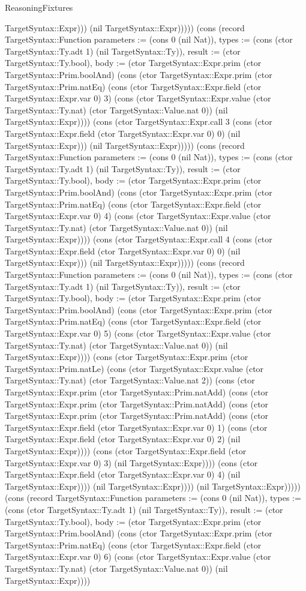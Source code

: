 \begin{lexlean}{ReasoningFixtures}
\begin{semanticmodule}
{TargetSyntax::Expr))) (nil TargetSyntax::Expr))))}) (cons (record TargetSyntax::Function {parameters := (cons 0 (nil Nat)), types := (cons (ctor TargetSyntax::Ty.adt 1) (nil TargetSyntax::Ty)), result := (ctor TargetSyntax::Ty.bool), body := (ctor TargetSyntax::Expr.prim (ctor TargetSyntax::Prim.boolAnd) (cons (ctor TargetSyntax::Expr.prim (ctor TargetSyntax::Prim.natEq) (cons (ctor TargetSyntax::Expr.field (ctor TargetSyntax::Expr.var 0) 3) (cons (ctor TargetSyntax::Expr.value (ctor TargetSyntax::Ty.nat) (ctor TargetSyntax::Value.nat 0)) (nil TargetSyntax::Expr)))) (cons (ctor TargetSyntax::Expr.call 3 (cons (ctor TargetSyntax::Expr.field (ctor TargetSyntax::Expr.var 0) 0) (nil TargetSyntax::Expr))) (nil TargetSyntax::Expr))))}) (cons (record TargetSyntax::Function {parameters := (cons 0 (nil Nat)), types := (cons (ctor TargetSyntax::Ty.adt 1) (nil TargetSyntax::Ty)), result := (ctor TargetSyntax::Ty.bool), body := (ctor TargetSyntax::Expr.prim (ctor TargetSyntax::Prim.boolAnd) (cons (ctor TargetSyntax::Expr.prim (ctor TargetSyntax::Prim.natEq) (cons (ctor TargetSyntax::Expr.field (ctor TargetSyntax::Expr.var 0) 4) (cons (ctor TargetSyntax::Expr.value (ctor TargetSyntax::Ty.nat) (ctor TargetSyntax::Value.nat 0)) (nil TargetSyntax::Expr)))) (cons (ctor TargetSyntax::Expr.call 4 (cons (ctor TargetSyntax::Expr.field (ctor TargetSyntax::Expr.var 0) 0) (nil TargetSyntax::Expr))) (nil TargetSyntax::Expr))))}) (cons (record TargetSyntax::Function {parameters := (cons 0 (nil Nat)), types := (cons (ctor TargetSyntax::Ty.adt 1) (nil TargetSyntax::Ty)), result := (ctor TargetSyntax::Ty.bool), body := (ctor TargetSyntax::Expr.prim (ctor TargetSyntax::Prim.boolAnd) (cons (ctor TargetSyntax::Expr.prim (ctor TargetSyntax::Prim.natEq) (cons (ctor TargetSyntax::Expr.field (ctor TargetSyntax::Expr.var 0) 5) (cons (ctor TargetSyntax::Expr.value (ctor TargetSyntax::Ty.nat) (ctor TargetSyntax::Value.nat 0)) (nil TargetSyntax::Expr)))) (cons (ctor TargetSyntax::Expr.prim (ctor TargetSyntax::Prim.natLe) (cons (ctor TargetSyntax::Expr.value (ctor TargetSyntax::Ty.nat) (ctor TargetSyntax::Value.nat 2)) (cons (ctor TargetSyntax::Expr.prim (ctor TargetSyntax::Prim.natAdd) (cons (ctor TargetSyntax::Expr.prim (ctor TargetSyntax::Prim.natAdd) (cons (ctor TargetSyntax::Expr.prim (ctor TargetSyntax::Prim.natAdd) (cons (ctor TargetSyntax::Expr.field (ctor TargetSyntax::Expr.var 0) 1) (cons (ctor TargetSyntax::Expr.field (ctor TargetSyntax::Expr.var 0) 2) (nil TargetSyntax::Expr)))) (cons (ctor TargetSyntax::Expr.field (ctor TargetSyntax::Expr.var 0) 3) (nil TargetSyntax::Expr)))) (cons (ctor TargetSyntax::Expr.field (ctor TargetSyntax::Expr.var 0) 4) (nil TargetSyntax::Expr)))) (nil TargetSyntax::Expr)))) (nil TargetSyntax::Expr))))}) (cons (record TargetSyntax::Function {parameters := (cons 0 (nil Nat)), types := (cons (ctor TargetSyntax::Ty.adt 1) (nil TargetSyntax::Ty)), result := (ctor TargetSyntax::Ty.bool), body := (ctor TargetSyntax::Expr.prim (ctor TargetSyntax::Prim.boolAnd) (cons (ctor TargetSyntax::Expr.prim (ctor TargetSyntax::Prim.natEq) (cons (ctor TargetSyntax::Expr.field (ctor TargetSyntax::Expr.var 0) 6) (cons (ctor TargetSyntax::Expr.value (ctor TargetSyntax::Ty.nat) (ctor TargetSyntax::Value.nat 0)) (nil TargetSyntax::Expr)))) }
\end{semanticmodule}
\end{lexlean}

